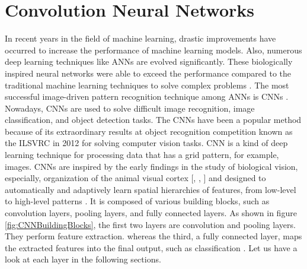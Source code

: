 \section{Convolution Neural Networks}\label{CNNs}


In recent years in the field of machine learning, drastic improvements have occurred to increase the performance of machine learning models. Also, numerous deep learning techniques like \acp{ANN} are evolved significantly. These biologically inspired neural networks were able to exceed the performance compared to the traditional machine learning techniques to solve complex problems \cite{oshea2015introduction}. The most successful image-driven pattern recognition technique among \acp{ANN} is \acp{CNN} \cite{oshea2015introduction}. Nowadays, \acp{CNN} are used to solve difficult image recognition, image classification, and object detection tasks. The \acp{CNN} have been a popular method because of its extraordinary results at object recognition competition known as the \ac{ILSVRC} in 2012 for solving computer vision tasks. \ac{CNN} is a kind of deep learning technique for processing data that has a grid pattern, for example, images. \acp{CNN} are inspired by the early findings in the study of biological vision, especially, organization of the animal visual cortex [\cite{Hubel.1968}, \cite{Fukushima.1980}, \cite{10.5555/3153997}] and designed to automatically and adaptively learn spatial hierarchies of features, from low-level to high-level patterns \cite{10.5555/3153997}. It is composed of various building blocks, such as convolution layers, pooling layers, and fully connected layers. As shown in figure \ref{fig:CNNBuildingBlocks}, the first two layers are convolution and pooling layers. They perform feature extraction. whereas the third, a fully connected layer, maps the extracted features into the final output, such as classification \cite{articleCNNs}. Let us have a look at each layer in the following sections.




